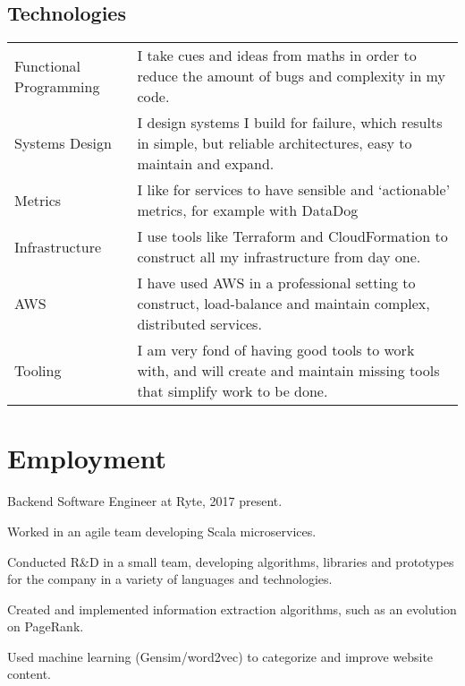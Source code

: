 \documentclass[a4paper]{article}
\renewenvironment{itemize}{
  \begin{list}{}{
    \setlength{\leftmargin}{1.5em}
  }
}{
  \end{list}
}
\begin{document}
\subsection*{Technologies}
\begin{tabular}{ l p{11.7cm} }
 Functional Programming & I take cues and ideas from maths in order to reduce the
amount of bugs and complexity in my code.\\
Systems Design & I design systems I build for failure, which results in simple,
but reliable architectures, easy to maintain and expand.\\
Metrics & I like for services to have sensible and `actionable' metrics, for
example with DataDog \\
Infrastructure & I use tools like Terraform and CloudFormation to
construct all my infrastructure from day one. \\
AWS & I have used AWS in a professional setting to construct, load-balance and
maintain complex, distributed services. \\
Tooling & I am very fond of having good tools to work with, and will create and
maintain missing tools that simplify work to be done. \\
\end{tabular}

\section*{Employment}

\begin{itemize}
\item Backend Software Engineer at Ryte, 2017 {\textendash}
  present.
        \begin{itemize}
            \item Worked in an agile team developing Scala microservices.
            \item Conducted R\&D in a small team, developing algorithms,
              libraries and prototypes for the company in a variety of languages
              and technologies.
            \item Created and implemented information extraction algorithms,
              such as an evolution on PageRank.
            \item Used machine learning (Gensim/word2vec) to categorize and
              improve website content.
        \end{itemize}
\end{itemize}
\end{document}
